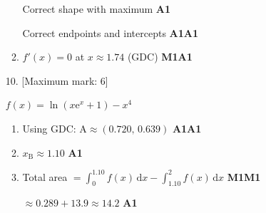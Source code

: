 \documentclass[12pt, twoside]{article}
\begin{document}
\begin{enumerate}[itemsep=0.15cm]
\begin{enumerate}
  Correct shape with maximum \hfill \textbf{A1}

  Correct endpoints and intercepts \hfill \textbf{A1A1}

  \setcounter{enumii}{1}
  \item $f'(x) = 0$ at $x \approx 1.74$ (GDC) \hfill \textbf{M1A1}
\end{enumerate}

\bigskip

\item[10.] [Maximum mark: 6]

$f(x) = \ln(x\mathrm{e}^{x}+1) - x^{4}$

\begin{enumerate}
  \item Using GDC: $\mathrm{A} \approx (0.720,\, 0.639)$ \hfill \textbf{A1A1}

  \item $x_{\mathrm{B}} \approx 1.10$ \hfill \textbf{A1}

  \item Total area $= \displaystyle\int_{0}^{1.10} f(x)\,\mathrm{d}x
        - \int_{1.10}^{2} f(x)\,\mathrm{d}x$ \hfill \textbf{M1M1}

  $\approx 0.289 + 13.9 \approx 14.2$ \hfill \textbf{A1}
\end{enumerate}

\end{enumerate}
\end{document}
